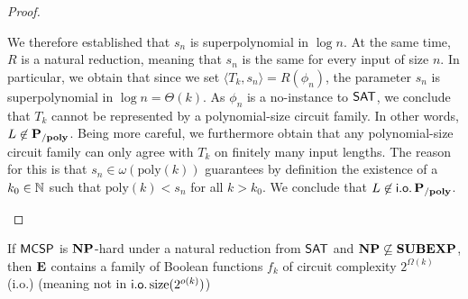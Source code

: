 \documentclass[11pt]{article}
\begin{document}
\begin{proof}
\begin{itemize}
\begin{enumerate}[(i)]
          We therefore established that $s_n$ is superpolynomial in $\log n$.
          At the same time, $R$ is a natural reduction, meaning that $s_n$ is
          the same for every input of size $n$.
          In particular, we obtain that since we set
          $\langle T_k, s_n \rangle = R(\phi_n)$, the parameter
          $s_n$ is superpolynomial in $\log n = \Theta(k)$.
          As $\phi_n$ is a no-instance to $\mathsf{SAT}$, we conclude that
          $T_k$ cannot be represented by a polynomial-size circuit family.
          In other words, $L \not\in \mathbf{P_{/poly}}$.
          Being more careful, we furthermore obtain that any polynomial-size
          circuit family can only agree with $T_k$ on finitely many
          input lengths. The reason for this is that
          $s_n \in \omega(\mathrm{poly}(k))$ guarantees
          by definition the existence of a $k_0 \in {\mathbb{N}}$ such that
          $\mathrm{poly}(k) < s_n$ for all $k > k_0$.
          We conclude that $L \not\in \mathsf{i.o.}\, \mathbf{P_{/poly}}$.
      \end{enumerate}
	\end{itemize}
\end{proof}

\begin{theorem}[\cite{10.1145/335305.335314}]
  \label{thm:15-2}
  If $\mathsf{MCSP}$ is $\mathbf{NP}$-hard under a natural reduction from
  $\mathsf{SAT}$ and $\mathbf{NP} \not\subseteq \mathbf{SUBEXP}$, then
  $\mathbf{E}$ contains a family of Boolean functions
  $f_k$ of circuit complexity $2^{\Omega(k)}$ (i.o.)
  {\color{gray}(meaning not in $\mathsf{i.o.}\, \mathrm{size}(2^{o(k)})$)}
\end{theorem}
\end{document}
